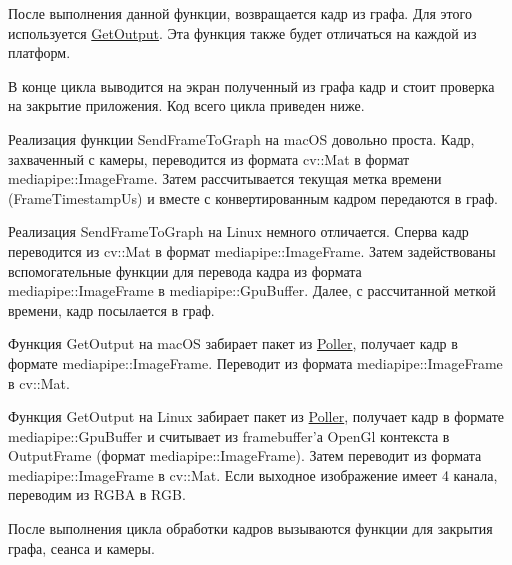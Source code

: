 \documentclass[a4paper,14pt]{extreport}
\begin{document}
        После выполнения данной функции, возвращается кадр из графа. Для этого используется \hyperlink{get}{GetOutput}. Эта функция также будет отличаться на каждой из платформ.

        В конце цикла выводится на экран полученный из графа кадр и стоит проверка на закрытие приложения. Код всего цикла приведен ниже.
        

        Реализация функции \hypertarget{send}{SendFrameToGraph} на macOS довольно проста. Кадр, захваченный с камеры, переводится из формата cv::Mat в формат mediapipe::ImageFrame. Затем рассчитывается текущая метка времени (FrameTimestampUs) и вместе с конвертированным кадром передаются в граф.
        

        Реализация \hypertarget{send}{SendFrameToGraph} на Linux немного отличается. Сперва кадр переводится из cv::Mat в формат mediapipe::ImageFrame. Затем задействованы вспомогательные функции для перевода кадра из формата mediapipe::ImageFrame в mediapipe::GpuBuffer. Далее, с рассчитанной меткой времени, кадр посылается в граф.
        

        Функция \hypertarget{get}{GetOutput} на macOS забирает пакет из \hyperlink{poller}{Poller}, получает кадр в формате mediapipe::ImageFrame. Переводит из формата mediapipe::ImageFrame в cv::Mat.
        

        Функция \hypertarget{get}{GetOutput} на Linux забирает пакет из \hyperlink{poller}{Poller}, получает кадр в формате mediapipe::GpuBuffer и считывает из framebuffer'а OpenGl контекста в OutputFrame (формат mediapipe::ImageFrame). Затем переводит из формата mediapipe::ImageFrame в cv::Mat. Если выходное изображение имеет 4 канала, переводим из RGBA в RGB.
        
        
        После выполнения цикла обработки кадров вызываются функции для закрытия графа, сеанса и камеры.
        
\end{document}
